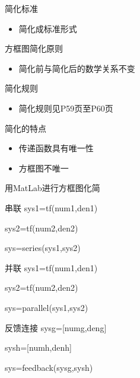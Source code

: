  \begin{frame}
 \begin{block}{简化标准}
 \begin{itemize}
 \item 简化成标准形式
 \end{itemize}
 \end{block}
 \begin{block}{方框图简化原则}
 \begin{itemize}
 \item 简化前与简化后的数学关系不变
 \end{itemize}
 \end{block}
 \begin{block}{简化规则}
 \begin{itemize}
 \item 简化规则见P59页至P60页
 \end{itemize}
 \end{block}
 \end{frame}
 \begin{frame}
 \begin{block}{简化的特点}
 \begin{itemize}
 \item 传递函数具有唯一性
 \item 方框图不唯一
 \end{itemize}
 \end{block}
 \end{frame}
 \begin{frame}{用MatLab进行方框图化简}
 \begin{block}{串联}
 sys1=tf(num1,den1)
 
 sys2=tf(num2,den2)
 
 sys=series(sys1,sys2)
 \end{block}
 \begin{block}{并联}
 sys1=tf(num1,den1)
 
 sys2=tf(num2,den2)
 
 sys=parallel(sys1,sys2)
 \end{block}
 \end{frame}
 \begin{frame}
 \begin{block}{反馈连接}
sysg=[numg,deng]

sysh=[numh,denh]

sys=feedback(sysg,sysh)
 \end{block}
 \end{frame}
